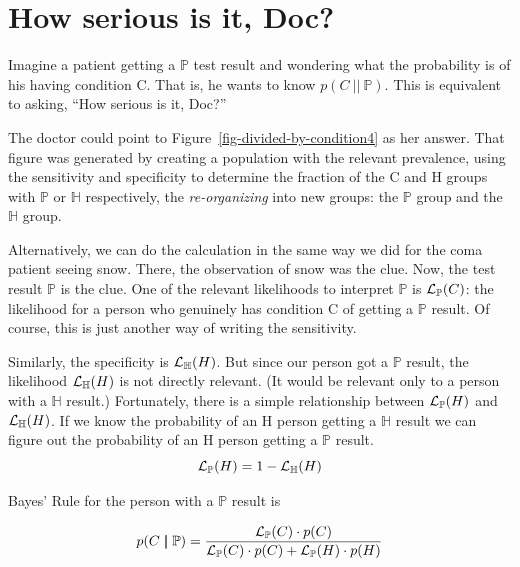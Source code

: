 \documentclass[
  letterpaper,
  DIV=11,
  numbers=noendperiod,
  oneside]{scrreprt}
\begin{document}
\hypertarget{sec-bayes-rule}{%
\section{How serious is it, Doc?}\label{sec-bayes-rule}}

Imagine a patient getting a \(\mathbb{P}\) test result and wondering
what the probability is of his having condition C. That is, he wants to
know \(p(C {\ |\!\!|\  } \mathbb{P})\). This is equivalent to asking,
``How serious is it, Doc?''

The doctor could point to Figure~\ref{fig-divided-by-condition4} as her
answer. That figure was generated by creating a population with the
relevant prevalence, using the sensitivity and specificity to determine
the fraction of the C and H groups with \(\mathbb{P}\) or \(\mathbb{H}\)
respectively, the \emph{re-organizing} into new groups: the
\(\mathbb{P}\) group and the \(\mathbb{H}\) group.

Alternatively, we can do the calculation in the same way we did for the
coma patient seeing snow. There, the observation of snow was the clue.
Now, the test result \(\mathbb{P}\) is the clue. One of the relevant
likelihoods to interpret \(\mathbb{P}\) is \({\cal L}_{\mathbb{P}}(C)\):
the likelihood for a person who genuinely has condition C of getting a
\(\mathbb{P}\) result. Of course, this is just another way of writing
the sensitivity.

Similarly, the specificity is \({\cal L}_{\mathbb{H}}(H)\). But since
our person got a \(\mathbb{P}\) result, the likelihood
\({\cal L}_{\mathbb{H}}(H)\) is not directly relevant. (It would be
relevant only to a person with a \(\mathbb{H}\) result.) Fortunately,
there is a simple relationship between \({\cal L}_{\mathbb{P}}(H)\) and
\({\cal L}_{\mathbb{H}}(H)\). If we know the probability of an H person
getting a \(\mathbb{H}\) result we can figure out the probability of an
H person getting a \(\mathbb{P}\) result.
\[{\cal L}_{\mathbb{P}}(H) = 1 - {\cal L}_{\mathbb{H}}(H)\]

Bayes' Rule for the person with a \(\mathbb{P}\) result is

\[p(C{\ |\!\!|\  } \mathbb{P}) = \frac{{\cal L}_{\mathbb{P}}(C) \cdot p(C)}{{\cal L}_{\mathbb{P}}(C) \cdot p(C) + {\cal L}_{\mathbb{P}}(H) \cdot p(H)}\]
\end{document}
